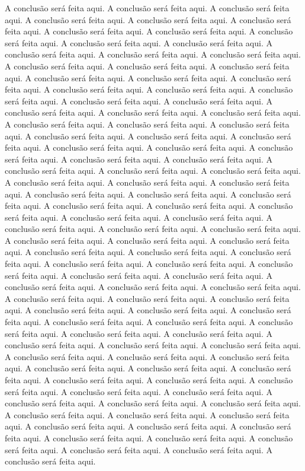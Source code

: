 A conclusão será feita aqui. A conclusão será feita aqui.
A conclusão será feita aqui. A conclusão será feita aqui.
A conclusão será feita aqui. A conclusão será feita aqui.
A conclusão será feita aqui. A conclusão será feita aqui.
A conclusão será feita aqui. A conclusão será feita aqui.
A conclusão será feita aqui. A conclusão será feita aqui.
A conclusão será feita aqui. A conclusão será feita aqui.
A conclusão será feita aqui. A conclusão será feita aqui.
A conclusão será feita aqui. A conclusão será feita aqui.
A conclusão será feita aqui. A conclusão será feita aqui.
A conclusão será feita aqui. A conclusão será feita aqui.
A conclusão será feita aqui. A conclusão será feita aqui.
A conclusão será feita aqui. A conclusão será feita aqui.
A conclusão será feita aqui. A conclusão será feita aqui.
A conclusão será feita aqui. A conclusão será feita aqui.
A conclusão será feita aqui. A conclusão será feita aqui.
A conclusão será feita aqui. A conclusão será feita aqui.
A conclusão será feita aqui. A conclusão será feita aqui.
A conclusão será feita aqui. A conclusão será feita aqui.
A conclusão será feita aqui. A conclusão será feita aqui.
A conclusão será feita aqui. A conclusão será feita aqui.
A conclusão será feita aqui. A conclusão será feita aqui.
A conclusão será feita aqui. A conclusão será feita aqui.
A conclusão será feita aqui. A conclusão será feita aqui.
A conclusão será feita aqui. A conclusão será feita aqui.
A conclusão será feita aqui. A conclusão será feita aqui.
A conclusão será feita aqui. A conclusão será feita aqui.
A conclusão será feita aqui. A conclusão será feita aqui.
A conclusão será feita aqui. A conclusão será feita aqui.
A conclusão será feita aqui. A conclusão será feita aqui.
A conclusão será feita aqui. A conclusão será feita aqui.
A conclusão será feita aqui. A conclusão será feita aqui.
A conclusão será feita aqui. A conclusão será feita aqui.
A conclusão será feita aqui. A conclusão será feita aqui.
A conclusão será feita aqui. A conclusão será feita aqui.
A conclusão será feita aqui. A conclusão será feita aqui.
A conclusão será feita aqui. A conclusão será feita aqui.
A conclusão será feita aqui. A conclusão será feita aqui.
A conclusão será feita aqui. A conclusão será feita aqui.
A conclusão será feita aqui. A conclusão será feita aqui.
A conclusão será feita aqui. A conclusão será feita aqui.
A conclusão será feita aqui. A conclusão será feita aqui.
A conclusão será feita aqui. A conclusão será feita aqui.
A conclusão será feita aqui. A conclusão será feita aqui.
A conclusão será feita aqui. A conclusão será feita aqui.
A conclusão será feita aqui. A conclusão será feita aqui.
A conclusão será feita aqui. A conclusão será feita aqui.
A conclusão será feita aqui. A conclusão será feita aqui.
A conclusão será feita aqui. A conclusão será feita aqui.
A conclusão será feita aqui. A conclusão será feita aqui.
A conclusão será feita aqui. A conclusão será feita aqui.
A conclusão será feita aqui. A conclusão será feita aqui.
A conclusão será feita aqui. A conclusão será feita aqui.
A conclusão será feita aqui. A conclusão será feita aqui.
A conclusão será feita aqui. A conclusão será feita aqui.